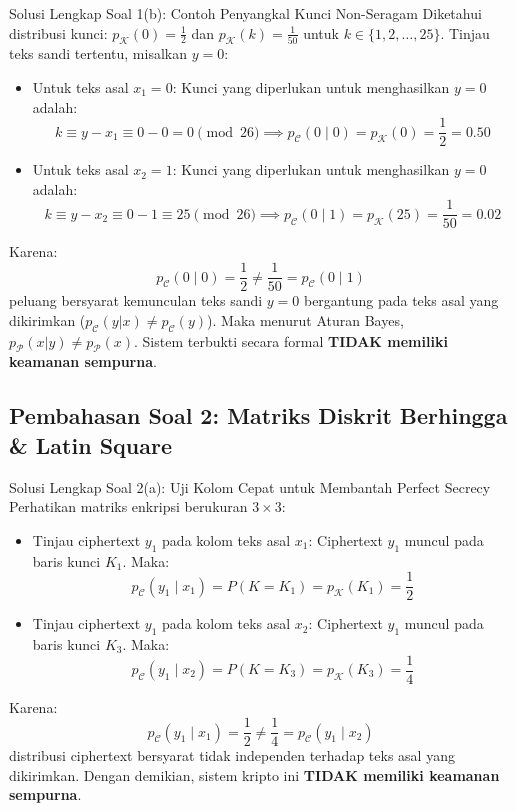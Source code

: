 \documentclass[11pt,a4paper]{article}
\begin{document}
\begin{solusibox}{Solusi Lengkap Soal 1(b): Contoh Penyangkal Kunci Non-Seragam}
Diketahui distribusi kunci: $p_{\mathcal{K}}(0) = \frac{1}{2}$ dan $p_{\mathcal{K}}(k) = \frac{1}{50}$ untuk $k \in \{1, 2, \dots, 25\}$.
Tinjau teks sandi tertentu, misalkan $y = 0$:
\begin{itemize}
    \item Untuk teks asal $x_1 = 0$:
    Kunci yang diperlukan untuk menghasilkan $y = 0$ adalah:
    \[
    k \equiv y - x_1 \equiv 0 - 0 = 0 \pmod{26} \implies p_{\mathcal{C}}(0 \mid 0) = p_{\mathcal{K}}(0) = \frac{1}{2} = 0.50
    \]
    \item Untuk teks asal $x_2 = 1$:
    Kunci yang diperlukan untuk menghasilkan $y = 0$ adalah:
    \[
    k \equiv y - x_2 \equiv 0 - 1 \equiv 25 \pmod{26} \implies p_{\mathcal{C}}(0 \mid 1) = p_{\mathcal{K}}(25) = \frac{1}{50} = 0.02
    \]
\end{itemize}
Karena:
\[
p_{\mathcal{C}}(0 \mid 0) = \frac{1}{2} \ne \frac{1}{50} = p_{\mathcal{C}}(0 \mid 1)
\]
peluang bersyarat kemunculan teks sandi $y = 0$ bergantung pada teks asal yang dikirimkan ($p_{\mathcal{C}}(y|x) \ne p_{\mathcal{C}}(y)$).
Maka menurut Aturan Bayes, $p_{\mathcal{P}}(x|y) \ne p_{\mathcal{P}}(x)$.
Sistem terbukti secara formal \textbf{TIDAK memiliki keamanan sempurna}.
\end{solusibox}

\newpage

\subsection{Pembahasan Soal 2: Matriks Diskrit Berhingga \& Latin Square}

\begin{solusibox}{Solusi Lengkap Soal 2(a): Uji Kolom Cepat untuk Membantah Perfect Secrecy}
Perhatikan matriks enkripsi berukuran $3 \times 3$:
\begin{itemize}
    \item Tinjau ciphertext $y_1$ pada kolom teks asal $x_1$:
    Ciphertext $y_1$ muncul pada baris kunci $K_1$. Maka:
    \[
    p_{\mathcal{C}}(y_1 \mid x_1) = P(K = K_1) = p_{\mathcal{K}}(K_1) = \frac{1}{2}
    \]
    \item Tinjau ciphertext $y_1$ pada kolom teks asal $x_2$:
    Ciphertext $y_1$ muncul pada baris kunci $K_3$. Maka:
    \[
    p_{\mathcal{C}}(y_1 \mid x_2) = P(K = K_3) = p_{\mathcal{K}}(K_3) = \frac{1}{4}
    \]
\end{itemize}
Karena:
\[
p_{\mathcal{C}}(y_1 \mid x_1) = \frac{1}{2} \ne \frac{1}{4} = p_{\mathcal{C}}(y_1 \mid x_2)
\]
distribusi ciphertext bersyarat tidak independen terhadap teks asal yang dikirimkan.
Dengan demikian, sistem kripto ini \textbf{TIDAK memiliki keamanan sempurna}.
\end{solusibox}
\end{document}
